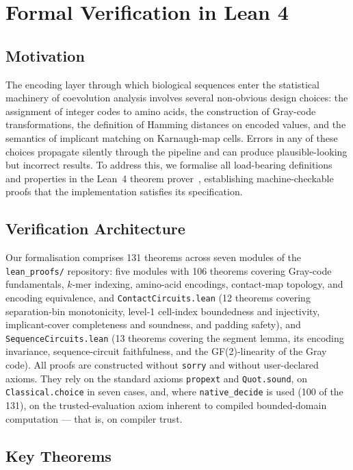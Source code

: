 \section{Formal Verification in Lean 4}
\label{sec:theory-lean}

\subsection{Motivation}
The encoding layer through which biological sequences enter the statistical
machinery of coevolution analysis involves several non-obvious design choices:
the assignment of integer codes to amino acids, the construction of Gray-code
transformations, the definition of Hamming distances on encoded values, and
the semantics of implicant matching on Karnaugh-map cells.  Errors in any of
these choices propagate silently through the pipeline and can produce
plausible-looking but incorrect results.  To address this, we formalise all
load-bearing definitions and properties in the Lean~4 theorem
prover~\cite{lean4}, establishing machine-checkable proofs that the
implementation satisfies its specification.

\subsection{Verification Architecture}
Our formalisation comprises 131 theorems across seven modules of the
\texttt{lean\_proofs/} repository: five modules with 106 theorems covering Gray-code
fundamentals, $k$-mer indexing, amino-acid encodings, contact-map topology,
and encoding equivalence, and \texttt{ContactCircuits.lean} (12 theorems
covering separation-bin monotonicity, level-1 cell-index boundedness and
injectivity, implicant-cover completeness and soundness, and padding safety), and
\texttt{SequenceCircuits.lean} (13 theorems covering the segment lemma, its
encoding invariance, sequence-circuit faithfulness, and the GF(2)-linearity of
the Gray code).
All proofs are constructed without \texttt{sorry} and without user-declared
axioms.  They rely on the standard axioms \texttt{propext} and
\texttt{Quot.sound}, on \texttt{Classical.choice} in seven cases, and, where
\texttt{native\_decide} is used (100 of the 131), on the trusted-evaluation
axiom inherent to compiled bounded-domain computation --- that is, on
compiler trust.

\subsection{Key Theorems}

